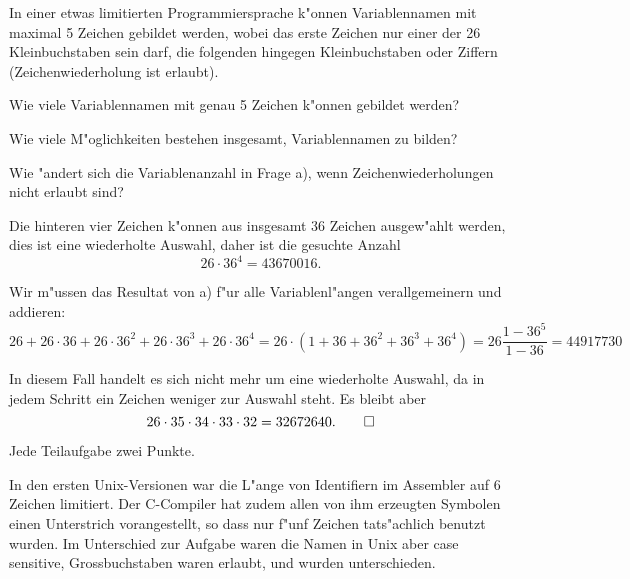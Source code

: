 In einer etwas limitierten Programmiersprache k"onnen Variablennamen
mit maximal 5 Zeichen gebildet werden, wobei das erste Zeichen nur
einer der 26 Kleinbuchstaben sein darf, die folgenden hingegen Kleinbuchstaben
oder Ziffern (Zeichenwiederholung ist erlaubt).
\begin{teilaufgaben}
\item
Wie viele Variablennamen mit genau 5 Zeichen k"onnen gebildet werden?
\item
Wie viele M"oglichkeiten bestehen insgesamt, Variablennamen zu bilden?
\item
Wie "andert sich die Variablenanzahl in Frage a),
wenn Zeichenwiederholungen nicht erlaubt sind?
\end{teilaufgaben}

\begin{loesung}
\begin{teilaufgaben}
\item Die hinteren vier Zeichen k"onnen aus insgesamt 36 Zeichen ausgew"ahlt
werden, dies ist eine wiederholte Auswahl, daher ist die gesuchte Anzahl
\[
26\cdot 36^4=43670016.
\]
\item 
Wir m"ussen das Resultat von a) f"ur alle Variablenl"angen verallgemeinern
und addieren:
\[
26
+
26\cdot 36
+
26\cdot 36^2
+
26\cdot 36^3
+
26\cdot 36^4
=
26 \cdot (1 + 36 + 36^2 + 36^3 + 36^4)=26\frac{1-36^5}{1-36}
=
44917730
\]
\item
In diesem Fall handelt es sich nicht mehr um eine wiederholte Auswahl,
da in jedem Schritt ein Zeichen weniger zur Auswahl steht. Es bleibt
aber
\[
26 \cdot 35 \cdot 34 \cdot 33 \cdot 32=32672640.
\qedhere
\]
\end{teilaufgaben}
\end{loesung}

\begin{bewertung}
Jede Teilaufgabe zwei Punkte.
\end{bewertung}

\begin{diskussion}
In den ersten Unix-Versionen war die L"ange von Identifiern im Assembler
auf 6 Zeichen limitiert. Der C-Compiler hat zudem allen von ihm 
erzeugten Symbolen einen Unterstrich vorangestellt, so dass nur f"unf
Zeichen tats"achlich benutzt wurden. Im Unterschied zur Aufgabe
waren die Namen in Unix aber case sensitive, Grossbuchstaben waren erlaubt,
und wurden unterschieden.
\end{diskussion}

